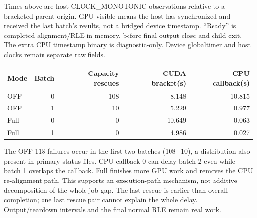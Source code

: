\documentclass[11pt,a4paper]{article}
\begin{document}
Times above are host CLOCK\_MONOTONIC observations relative to a bracketed parent origin. GPU-visible means the host has synchronized and received the last batch's results, not a bridged device timestamp. ``Ready'' is completed alignment/RLE in memory, before final output close and child exit. The extra CPU timestamp binary is diagnostic-only. Device globaltimer and host clocks remain separate raw fields.

\begin{center}\small\begin{tabular}{lrrrr}\toprule
Mode & Batch & Capacity rescues & CUDA bracket(s) & CPU callback(s)\\\midrule
OFF & 0 & 108 & 8.148 & 10.815\\
OFF & 1 & 10 & 5.229 & 0.977\\
Full & 0 & 0 & 10.649 & 0.063\\
Full & 1 & 0 & 4.986 & 0.027\\
\bottomrule\end{tabular}\end{center}

The OFF 118 failures occur in the first two batches (108+10), a distribution also present in primary status files. CPU callback 0 can delay batch 2 even while batch 1 overlaps the callback. Full finishes more GPU work and removes the CPU re-alignment path. This supports an execution-path mechanism, not additive decomposition of the whole-job gap. The last rescue is earlier than overall completion; one last rescue pair cannot explain the whole delay. Output/teardown intervals and the final normal RLE remain real work.
\end{document}
